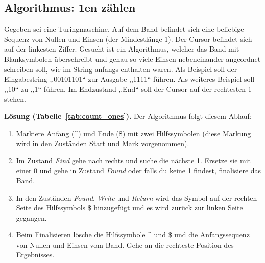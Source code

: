 \subsection{Algorithmus: 1en zählen}
%
Gegeben sei eine Turingmaschine. Auf dem Band befindet sich eine beliebige Sequenz von Nullen und Einsen (der Mindestlänge 1). Der Cursor befindet sich auf der linkesten Ziffer. Gesucht ist ein Algorithmus, welcher das Band mit Blanksymbolen überschreibt und genau so viele Einsen nebeneinander angeordnet schreiben soll, wie im String anfangs enthalten waren. Als Beispiel soll der Eingabestring ,,00101101`` zur Ausgabe ,,1111`` führen. Als weiteres Beispiel soll ,,10`` zu ,,1`` führen. Im Endzustand ,,End`` soll der Cursor auf der rechtesten 1 stehen.

\textbf{Lösung (Tabelle~\ref{tab:count_ones}).} Der Algorithmus folgt diesem Ablauf:
\begin{enumerate}
  \item Markiere Anfang (\^{}) und Ende (\$) mit zwei Hilfssymbolen
        (diese Markung wird in den Zuständen Start und Mark vorgenommen).
  \item Im Zustand \textit{Find} gehe nach rechts und suche die nächste 1.
        Ersetze sie mit einer 0 und gehe in Zustand \textit{Found} oder falls du keine 1 findest,
        finalisiere das Band.
  \item In den Zuständen \textit{Found}, \textit{Write} und \textit{Return} wird das Symbol
        auf der rechten Seite des Hilfssymbols \$ hinzugefügt und es wird zurück zur linken Seite gegangen.
  \item Beim Finalisieren lösche die Hilfssymbole \^{} und \$ und die Anfangssequenz von Nullen und Einsen
        vom Band. Gehe an die rechteste Position des Ergebnisses.
\end{enumerate}
%
